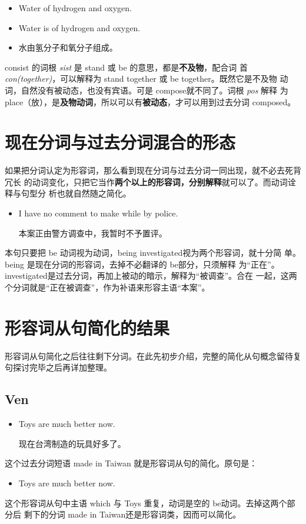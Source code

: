 \begin{itemize}
\item Water  of hydrogen and oxygen.
\item Water is  of hydrogen and oxygen.
\item 水由氢分子和氧分子组成。
\end{itemize}

consist 的词根 \emph{sist} 是 stand 或 be 的意思，都是\textbf{不及物}，配合词
首\emph{con(together)}，可以解释为 stand together 或 be together。既然它是不及物
动词，自然没有被动态，也没有宾语。可是 compose就不同了。词根 \emph{pos} 解释
为place（放），是\textbf{及物动词}，所以可以有\textbf{被动态}，才可以用到过去分词 composed。

\section{现在分词与过去分词混合的形态}

如果把分词认定为形容词，那么看到现在分词与过去分词一同出现，就不必去死背冗长
的动词变化，只把它当作\textbf{两个以上的形容词，分别解释}就可以了。而动词诠释与句型分
析也就自然随之简化。

\begin{itemize}
\item I have no comment to make while    by police.

  本案正由警方调查中，我暂时不予置评。
\end{itemize}
本句只要把 be 动词视为动词，being investigated视为两个形容词，就十分简
单。being 是现在分词的形容词，去掉不必翻译的 be部分，只须解释
为“正在”。investigated是过去分词，再加上被动的暗示，解释为“被调查”。合在
一起，这两个分词就是“正在被调查”，作为补语来形容主语“本案”。

\section{形容词从句简化的结果}

形容词从句简化之后往往剩下分词。在此先初步介绍，完整的简化从句概念留待复句探讨完毕之后再详加整理。

\subsection{Ven}

\begin{itemize}
\item  Toys  are much better now.

  现在台湾制造的玩具好多了。
\end{itemize}
这个过去分词短语 made in Taiwan 就是形容词从句的简化。原句是：
\begin{itemize}
\item  Toys  are much better now.
\end{itemize}
这个形容词从句中主语 which 与 Toys 重复，动词是空的 be动词。去掉这两个部分后
剩下的分词 made in Taiwan还是形容词类，因而可以简化。

